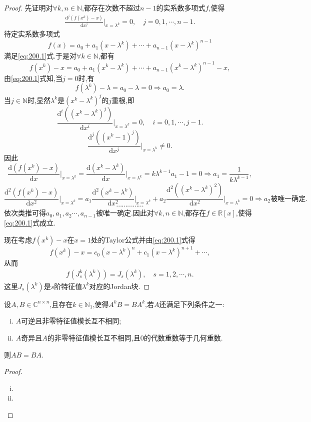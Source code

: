 \documentclass[../../main.tex]{subfiles}%
\begin{document}
\begin{proof}
先证明对$\forall k,n\in \mathbb{N}$,都存在次数不超过$n-1$的实系数多项式$f$,使得
\begin{align}
\frac{\mathrm{d}^j\left( f\left( x^k \right) -x \right)}{\mathrm{d}x^j}\bigg|_{x=\lambda^k}=0,\quad j=0,1,\cdots ,n-1.
\label{eq:200.1}
\end{align}
待定实系数多项式
\[
f(x) =a_0+a_1(x-\lambda^k) +\cdots +a_{n-1}(x-\lambda^k) ^{n-1}
\]
满足\eqref{eq:200.1}式.于是对$\forall k\in \mathbb{N}$,都有
\[
f(x^k) -x=a_0+a_1(x^k-\lambda^k) +\cdots +a_{n-1}(x^k-\lambda^k) ^{n-1}-x,
\]
由\eqref{eq:200.1}式知,当$j=0$时,有
\[
f(\lambda^k) -\lambda=a_0-\lambda=0\Longrightarrow a_0=\lambda.
\]
当$j\in \mathbb{N}$时,显然$\lambda^k$是$(x^k-\lambda^k)^j$的$j$重根,即
\[
\frac{\mathrm{d}^i\left( (x^k-\lambda^k)^j \right)}{\mathrm{d}x^i}\bigg|_{x=\lambda^k}=0,\quad i=0,1,\cdots ,j-1.
\]
\[
\frac{\mathrm{d}^j\left( (x^k-1)^j \right)}{\mathrm{d}x^j}\bigg|_{x=\lambda^k}\ne 0.
\]
因此
\[
\frac{\mathrm{d}\left( f(x^k) -x \right)}{\mathrm{d}x}\bigg|_{x=\lambda^k}=\frac{\mathrm{d}\left( x^k-\lambda ^k \right)}{\mathrm{d}x}\bigg|_{x=\lambda^k}=k\lambda ^{k-1}a_1-1=0\Longrightarrow a_1=\frac{1}{k\lambda ^{k-1}},
\]
\[
\frac{\mathrm{d}^2\left( f(x^k) -x \right)}{\mathrm{d}x^2}\bigg|_{x=\lambda^k}= a_1\frac{\mathrm{d}^2\left( x^k-\lambda^k \right)}{\mathrm{d}x^2}\bigg|_{x=\lambda^k}+a_2\frac{\mathrm{d}^2\left( (x^k-\lambda^k)^2 \right)}{\mathrm{d}x^2}\bigg|_{x=\lambda^k}=0\Longrightarrow a_2\text{被唯一确定}.
\]
\[
\cdots \cdots \cdots \cdots \cdots
\]
依次类推可得$a_0,a_1,a_2\cdots ,a_{n-1}$被唯一确定.因此对$\forall k,n\in \mathbb{N}$,都存在$f\in \mathbb{R}[x]$,使得\eqref{eq:200.1}式成立.

现在考虑$f(x^k) -x$在$x=1$处的Taylor公式并由\eqref{eq:200.1}式得
\[
f(x^k) -x=c_0(x-\lambda^k)^n+c_1(x-\lambda^k)^{n+1}+\cdots,
\]
从而
\begin{align*}
f\left( J_{s}^{k}(\lambda^k) \right) =J_s(\lambda^k),\quad s=1,2,\cdots ,n.
\end{align*}
这里$J_s(\lambda^k)$是$s$阶特征值$\lambda^k$对应的Jordan块.
\end{proof}

\begin{corollary}
设$A,B\in \mathbb{C} ^{n\times n}$,且存在$k\in \mathbb{N} _1$,使得$A^kB=BA^k$,若$A$还满足下列条件之一:
\begin{enumerate}[(i)]
\item $A$可逆且非零特征值模长互不相同;

\item $A$奇异且$A$的非零特征值模长互不相同,且0的代数重数等于几何重数.
\end{enumerate}
则$AB=BA.$
\end{corollary}
\begin{proof}
\begin{enumerate}[(i)]
\item 

\item 
\end{enumerate}
\end{proof}
\end{document}
